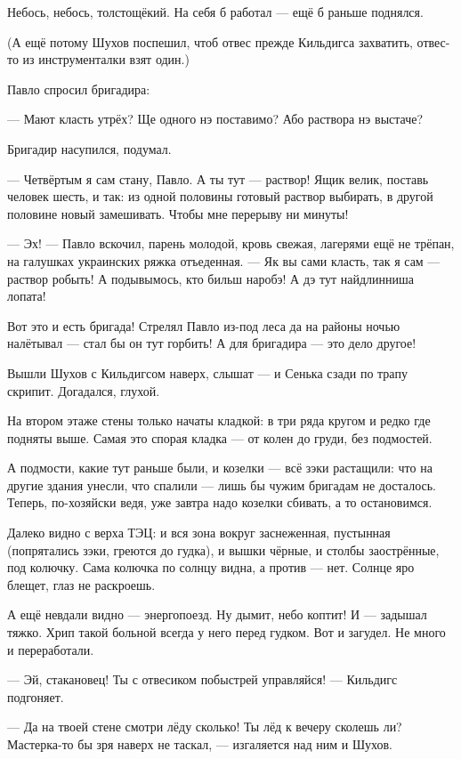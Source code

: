 Небось, небось, толстощёкий. На себя б работал --- ещё б раньше поднялся.

(А ещё потому Шухов поспешил, чтоб отвес прежде Кильдигса захватить, отвес-то из
инструменталки взят один.)

Павло спросил бригадира:

--- Мают класть утрёх? Ще одного нэ поставимо? Або раствора нэ выстаче?

Бригадир насупился, подумал.

--- Четвёртым я сам стану, Павло. А ты тут --- раствор! Ящик велик, поставь человек шесть, и так:
из одной половины готовый раствор выбирать, в другой половине новый замешивать. Чтобы мне
перерыву ни минуты!

--- Эх! --- Павло вскочил, парень молодой, кровь свежая, лагерями ещё не трёпан, на галушках
украинских ряжка отъеденная. --- Як вы сами класть, так я сам --- раствор робыть! А подывымось,
кто бильш наробэ! А дэ тут найдлинниша лопата!

Вот это и есть бригада! Стрелял Павло из-под леса да на районы ночью налётывал --- стал бы он
тут горбить! А для бригадира --- это дело другое!

Вышли Шухов с Кильдигсом наверх, слышат --- и Сенька сзади по трапу скрипит. Догадался, глухой.

На втором этаже стены только начаты кладкой: в три ряда кругом и редко где подняты выше.
Самая это спорая кладка --- от колен до груди, без подмостей.

А подмости, какие тут раньше были, и козелки --- всё зэки растащили: что на другие здания
унесли, что спалили --- лишь бы чужим бригадам не досталось. Теперь, по-хозяйски ведя, уже
завтра надо козелки сбивать, а то остановимся.

Далеко видно с верха ТЭЦ: и вся зона вокруг заснеженная, пустынная (попрятались зэки, греются
до гудка), и вышки чёрные, и столбы заострённые, под колючку. Сама колючка по солнцу видна, а
против --- нет. Солнце яро блещет, глаз не раскроешь.

А ещё невдали видно --- энергопоезд. Ну дымит, небо коптит! И --- задышал тяжко. Хрип такой
больной всегда у него перед гудком. Вот и загудел. Не много и переработали.

--- Эй, стакановец! Ты с отвесиком побыстрей управляйся! --- Кильдигс подгоняет.

--- Да на твоей стене смотри лёду сколько! Ты лёд к вечеру сколешь ли? Мастерка-то бы зря наверх
не таскал, --- изгаляется над ним и Шухов.

